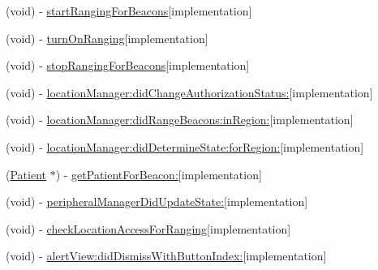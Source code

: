 \begin{DoxyCompactItemize}
\item 
(void) -\/ \hyperlink{interface_beacon_view_controller_aae9c9d75448a1231b8d7f039aab9324f}{start\+Ranging\+For\+Beacons}{\ttfamily  \mbox{[}implementation\mbox{]}}
\item 
(void) -\/ \hyperlink{interface_beacon_view_controller_abef290f9a571504ba6eca38fd0b9c58c}{turn\+On\+Ranging}{\ttfamily  \mbox{[}implementation\mbox{]}}
\item 
(void) -\/ \hyperlink{interface_beacon_view_controller_a71a11c35d0f118a076b2cda77792ed1f}{stop\+Ranging\+For\+Beacons}{\ttfamily  \mbox{[}implementation\mbox{]}}
\item 
(void) -\/ \hyperlink{interface_beacon_view_controller_a35192ca14f9321dd94326ba10332579e}{location\+Manager\+:did\+Change\+Authorization\+Status\+:}{\ttfamily  \mbox{[}implementation\mbox{]}}
\item 
(void) -\/ \hyperlink{interface_beacon_view_controller_abe162efe189b5728bf08fa894ddee583}{location\+Manager\+:did\+Range\+Beacons\+:in\+Region\+:}{\ttfamily  \mbox{[}implementation\mbox{]}}
\item 
(void) -\/ \hyperlink{interface_beacon_view_controller_a58ba94ae585d21efd78e4dc20e750371}{location\+Manager\+:did\+Determine\+State\+:for\+Region\+:}{\ttfamily  \mbox{[}implementation\mbox{]}}
\item 
(\hyperlink{interface_patient}{Patient} $\ast$) -\/ \hyperlink{interface_beacon_view_controller_ac36768b3d37af40fbb8d8b9108ce5d47}{get\+Patient\+For\+Beacon\+:}{\ttfamily  \mbox{[}implementation\mbox{]}}
\item 
(void) -\/ \hyperlink{interface_beacon_view_controller_abe0de5e2a4c15c44f366d1f40f1432af}{peripheral\+Manager\+Did\+Update\+State\+:}{\ttfamily  \mbox{[}implementation\mbox{]}}
\item 
(void) -\/ \hyperlink{interface_beacon_view_controller_a9971a8a8b2c80ac30fd6c90fb81a621f}{check\+Location\+Access\+For\+Ranging}{\ttfamily  \mbox{[}implementation\mbox{]}}
\item 
(void) -\/ \hyperlink{interface_beacon_view_controller_af8ed379dda505c8a4c98ff1aa11f2d43}{alert\+View\+:did\+Dismiss\+With\+Button\+Index\+:}{\ttfamily  \mbox{[}implementation\mbox{]}}
\end{DoxyCompactItemize}
